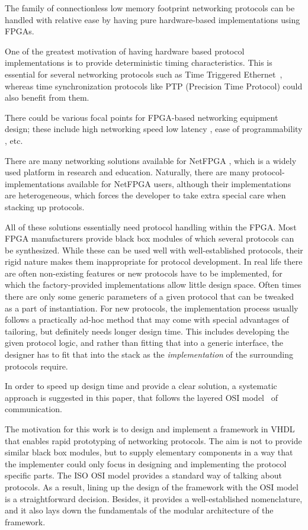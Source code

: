 \documentclass[journal]{IEEEtran}
\begin{document}
The family of connectionless low memory footprint networking protocols can be handled with relative ease by having pure
hardware-based implementations using FPGAs.

One of the greatest motivation of having hardware based protocol implementations is to provide deterministic timing
characteristics. This is essential for several networking protocols such as Time Triggered Ethernet~\cite{SAE_AS6802},
whereas time synchronization protocols like PTP (Precision Time Protocol) \cite{PTP_standard}could also benefit from
them.

There could be various focal points for FPGA-based networking equipment design; these include high networking speed
\cite{C-GEP_HPSR} low latency \cite{related:TrustNode}, ease of programmability \cite{C-Board_NEMA}, etc.

There are many networking solutions available for NetFPGA \cite{NetFPGA}, which is a widely used platform
in research and education. Naturally, there are many protocol-implementations available for NetFPGA users, although
their implementations are heterogeneous, which forces the developer to take extra special care when stacking up
protocols.

All of these solutions essentially need protocol handling within the FPGA. Most FPGA manufacturers provide black box
modules of which several protocols can be synthesized. While these can be used well with well-established protocols,
their rigid nature makes them inappropriate for protocol development.
In real life there are often non-existing features
or new protocols have to be implemented, for which the factory-provided implementations allow little design space.
Often times there are only some generic parameters of a given protocol that can be tweaked as a part of instantiation.
For new protocols, the implementation process usually follows a practically ad-hoc method that may come with special
advantages of tailoring, but definitely needs longer design time.
This includes developing the given protocol logic, and rather than fitting that into a generic interface,
the designer has to fit that into the stack as the \emph{implementation} of the surrounding protocols require.

In order to speed up design time and provide a clear solution, a systematic approach is suggested in this paper,
that follows the layered OSI model~\cite{ISO:OSI} of communication.

The motivation for this work is to design and implement a framework in VHDL that enables rapid prototyping of
networking protocols. The aim is not to provide similar black box modules, but to supply elementary components in a way
that the implementer could only focus in designing and implementing the protocol specific parts. The ISO OSI model
provides a standard way of talking about protocols. As a result, lining up the design of the framework with the OSI
model is a straightforward decision. Besides, it provides a well-established nomenclature, and it also lays down the
fundamentals of the modular architecture of the framework.
\end{document}
